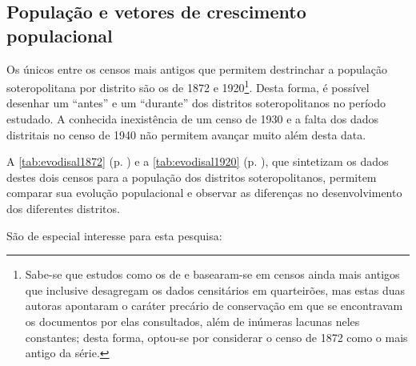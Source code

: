 \subsection{População e vetores de crescimento populacional}\label{subsubsec:populacaosalvador}

Os únicos entre os censos mais antigos que permitem destrinchar a população soteropolitana por distrito são os de 1872 e 1920\footnote{Sabe-se que estudos como os de  e  basearam-se em censos ainda mais antigos que inclusive desagregam os dados censitários em quarteirões, mas estas duas autoras apontaram o caráter precário de conservação em que se encontravam os documentos por elas consultados, além de inúmeras lacunas neles constantes; desta forma, optou-se por considerar o censo de 1872 como o mais antigo da série.}. Desta forma, é possível desenhar um ``antes'' e um ``durante'' dos distritos soteropolitanos no período estudado. A conhecida inexistência de um censo de 1930 e a falta dos dados distritais no censo de 1940 não permitem avançar muito além desta data. 

A \autoref{tab:evodisal1872} (p. \pageref{tab:evodisal1872}) e a \autoref{tab:evodisal1920} (p. \pageref{tab:evodisal1920}), que sintetizam os dados destes dois censos para a população dos distritos soteropolitanos, permitem comparar sua evolução populacional e observar as diferenças no desenvolvimento dos diferentes distritos. 




São de especial interesse para esta pesquisa:

